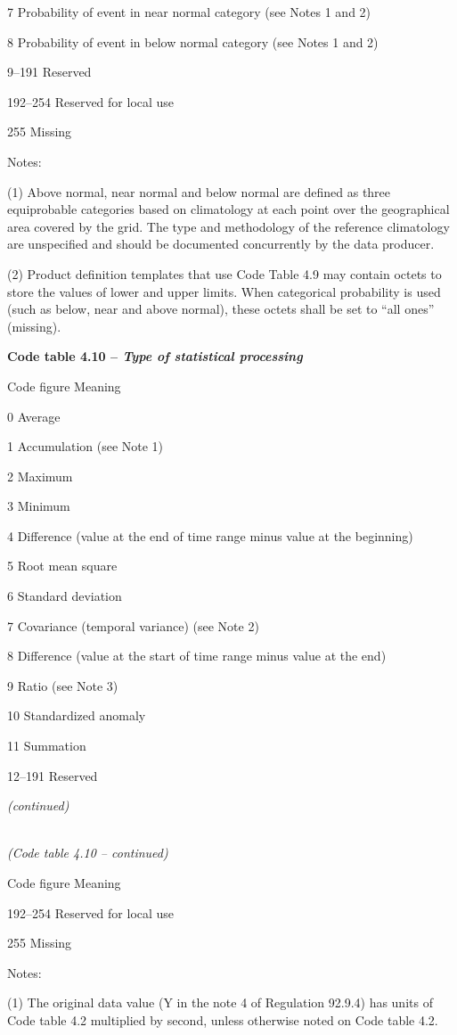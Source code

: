 7 Probability of event in near normal category (see Notes 1 and 2)

8 Probability of event in below normal category (see Notes 1 and 2)

9--191 Reserved

192--254 Reserved for local use

255 Missing

Notes:

(1) Above normal, near normal and below normal are defined as three equiprobable categories based on climatology at each point over the geographical area covered by the grid. The type and methodology of the reference climatology are unspecified and should be documented concurrently by the data producer.

(2) Product definition templates that use Code Table 4.9 may contain octets to store the values of lower and upper limits. When categorical probability is used (such as below, near and above normal), these octets shall be set to ``all ones'' (missing).

\textbf{Code table 4.10 -- \emph{Type of statistical processing}}

Code figure Meaning

0 Average

1 Accumulation (see Note 1)

2 Maximum

3 Minimum

4 Difference (value at the end of time range minus value at the beginning)

5 Root mean square

6 Standard deviation

7 Covariance (temporal variance) (see Note 2)

8 Difference (value at the start of time range minus value at the end)

9 Ratio (see Note 3)

10 Standardized anomaly

11 Summation

12--191 Reserved

\emph{(continued)}

\emph{\\
(Code table 4.10 -- continued)}

Code figure Meaning

192--254 Reserved for local use

255 Missing

Notes:

(1) The original data value (Y in the note 4 of Regulation 92.9.4) has units of Code table 4.2 multiplied by second, unless otherwise noted on Code table 4.2.

